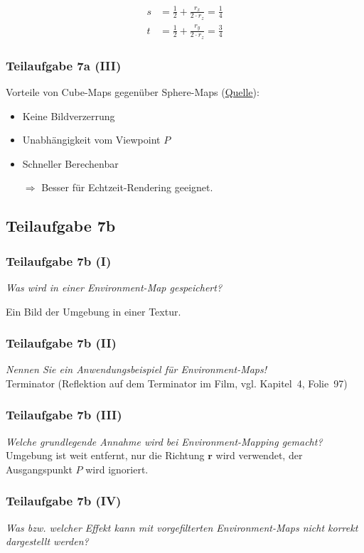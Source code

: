 \documentclass[a4paper]{scrartcl}
\begin{document}
\begin{align}
    s &= \frac{1}{2} + \frac{r_x}{2 \cdot r_z} = \frac{1}{4}\\
    t &= \frac{1}{2} + \frac{r_y}{2 \cdot r_z} = \frac{3}{4}
\end{align}

\subsubsection*{Teilaufgabe 7a (III)}
Vorteile von Cube-Maps gegenüber Sphere-Maps (\href{https://en.wikipedia.org/wiki/Cube_mapping}{Quelle}):
\begin{itemize}
    \item Keine Bildverzerrung
    \item Unabhängigkeit vom Viewpoint $P$
    \item Schneller Berechenbar
    \item[$\Rightarrow$] Besser für Echtzeit-Rendering geeignet.
\end{itemize}


\subsection*{Teilaufgabe 7b}
\subsubsection*{Teilaufgabe 7b (I)}
\textit{Was wird in einer Environment-Map gespeichert?}

Ein Bild der Umgebung in einer Textur.

\subsubsection*{Teilaufgabe 7b (II)}
\textit{Nennen Sie ein Anwendungsbeispiel für Environment-Maps!}\\
Terminator (Reflektion auf dem Terminator im Film, vgl. Kapitel~4, Folie~97)

\subsubsection*{Teilaufgabe 7b (III)}
\textit{Welche grundlegende Annahme wird bei Environment-Mapping gemacht?}\\
Umgebung ist weit entfernt, nur die Richtung $\mathbf{r}$ wird verwendet, der Ausgangspunkt $P$ wird ignoriert.

\subsubsection*{Teilaufgabe 7b (IV)}
\textit{Was bzw. welcher Effekt kann mit vorgefilterten Environment-Maps nicht korrekt dargestellt werden?}
\end{document}
